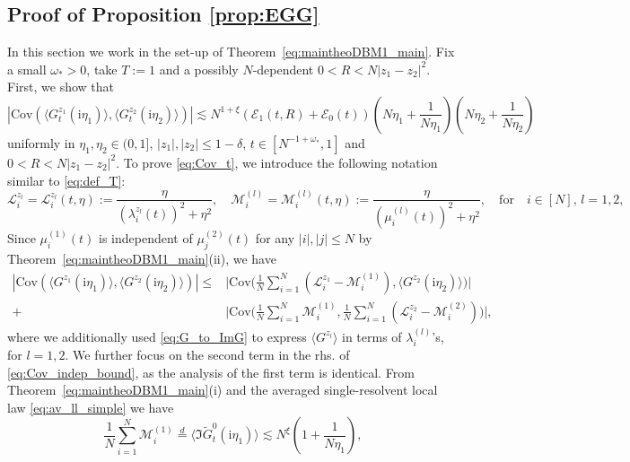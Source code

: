 \documentclass[10pt]{amsart}
\numberwithin{equation}{section}
\newcommand{\Cov}{\mathrm{Cov}}
\newcommand{\ii}{\mathrm{i}}
\begin{document}
\subsection{Proof of Proposition \ref{prop:EGG}}\label{sec:proof_EGG} In this section we work in the set-up of Theorem~\ref{eq:maintheoDBM1_main}. Fix a small $\omega_*>0$, take $T:=1$ and a possibly $N$-dependent $0<R<N|z_1-z_2|^2$. First, we show that
\begin{equation}
\left\vert \Cov \left(\langle G^{z_1}_t(\ii\eta_1)\rangle, \langle G^{z_2}_t(\ii\eta_2)\rangle\right)\right\vert \lesssim N^{1+\xi}\left(\mathcal{E}_1(t,R) + \mathcal{E}_0(t)\right)\left(N\eta_1+\frac{1}{N\eta_1}\right)\left(N\eta_2+\frac{1}{N\eta_2}\right)
\label{eq:Cov_t}
\end{equation}
uniformly in $\eta_1,\eta_2\in (0,1]$, $|z_1|,|z_2|\le 1-\delta$, $t\in [N^{-1+\omega_*},1]$ and $0<R<N|z_1-z_2|^2$. To prove \eqref{eq:Cov_t}, we introduce the following notation similar to \eqref{eq:def_T}:
\begin{equation}
\mathscr{L}_i^{z_l}=\mathscr{L}_i^{z_l}(t,\eta):= \frac{\eta}{( \lambda_i^{z_l}(t))^2 +\eta^2},\quad \mathscr{M}_i^{(l)}=\mathscr{M}_i^{(l)}(t,\eta):= \frac{\eta}{(\mu_i^{(l)}(t))^2 +\eta^2},\quad \text{for}\quad i\in [N],\, l=1,2,
\label{eq:def_T_l}
\end{equation}
Since $\mu_i^{(1)}(t)$ is independent of $\mu_j^{(2)}(t)$ for any $|i|,|j|\le N$ by Theorem~\ref{eq:maintheoDBM1_main}(ii), we have
\begin{equation}
\begin{split}
\left\vert \Cov\left(\langle G^{z_1}(\ii\eta_1)\rangle,\langle G^{z_2}(\ii\eta_2)\rangle\right)\right\vert \le& \bigg\vert\Cov \bigg(\frac{1}{N}\sum_{i=1}^N \left(\mathscr{L}^{z_1}_i-\mathscr{M}^{(1)}_i\right), \langle G^{z_2}(\ii\eta_2)\rangle\bigg)\bigg\vert\\
 + &\bigg\vert\Cov \bigg(\frac{1}{N}\sum_{i=1}^N \mathscr{M}^{(1)}_i, \frac{1}{N}\sum_{i=1}^N \left(\mathscr{L}^{z_2}_i-\mathscr{M}^{(2)}_i\right)\bigg)\bigg\vert,
\end{split}
\label{eq:Cov_indep_bound}
\end{equation}
where we additionally used \eqref{eq:G_to_ImG} to express $\langle G^{z_l}\rangle$ in terms of $\lambda_i^{(l)}$'s, for $l=1,2$. We further focus on the second term in the rhs. of \eqref{eq:Cov_indep_bound}, as the analysis of the first term is identical. From Theorem~\ref{eq:maintheoDBM1_main}(i) and the averaged single-resolvent local law \eqref{eq:av_ll_simple} we have
\begin{equation}
\frac{1}{N}\sum_{i=1}^N \mathscr{M}^{(1)}_i\stackrel{d}{=}\langle \Im \widetilde{G}^0_t(\ii\eta_1)\rangle \lesssim N^{\xi}\left(1+\frac{1}{N\eta_1}\right),
\end{equation}
\end{document}
